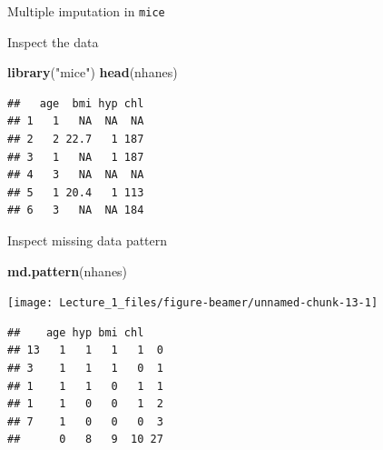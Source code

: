 \documentclass[ignorenonframetext,aspectratio=43]{beamer}
\newenvironment{Shaded}{\begin{snugshade}}{\end{snugshade}}
\newcommand{\KeywordTok}[1]{\textcolor[rgb]{0.13,0.29,0.53}{\textbf{#1}}}
\newcommand{\NormalTok}[1]{#1}
\newcommand{\StringTok}[1]{\textcolor[rgb]{0.31,0.60,0.02}{#1}}
\begin{document}
\begin{frame}{Multiple imputation in \texttt{mice}}
\protect\hypertarget{multiple-imputation-in-mice}{}


\end{frame}

\begin{frame}[fragile]{Inspect the data}
\protect\hypertarget{inspect-the-data}{}

\begin{Shaded}
\begin{Highlighting}[]
\KeywordTok{library}\NormalTok{(}\StringTok{"mice"}\NormalTok{)}
\KeywordTok{head}\NormalTok{(nhanes)}
\end{Highlighting}
\end{Shaded}

\begin{verbatim}
##   age  bmi hyp chl
## 1   1   NA  NA  NA
## 2   2 22.7   1 187
## 3   1   NA   1 187
## 4   3   NA  NA  NA
## 5   1 20.4   1 113
## 6   3   NA  NA 184
\end{verbatim}

\end{frame}

\begin{frame}[fragile]{Inspect missing data pattern}
\protect\hypertarget{inspect-missing-data-pattern}{}

\begin{Shaded}
\begin{Highlighting}[]
\KeywordTok{md.pattern}\NormalTok{(nhanes)}
\end{Highlighting}
\end{Shaded}

\begin{center}\texttt{[image: Lecture\_1\_files/figure-beamer/unnamed-chunk-13-1]} \end{center}

\begin{verbatim}
##    age hyp bmi chl   
## 13   1   1   1   1  0
## 3    1   1   1   0  1
## 1    1   1   0   1  1
## 1    1   0   0   1  2
## 7    1   0   0   0  3
##      0   8   9  10 27
\end{verbatim}

\end{frame}
\end{document}
